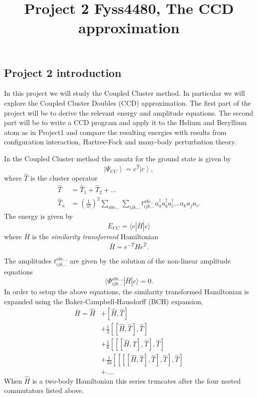 \documentclass[a4paper,10pt]{article}
\title{Project 2 Fyss4480, The CCD approximation}
\author{}
\newcommand{\braket}[1]{\langle#1\rangle}
\newcommand{\ket}[1]{\left| #1 \right\rangle} \newcommand{\element}[3]
\theoremstyle{definition}
\begin{document}
\maketitle

\subsection*{Project 2 introduction}
In this project we will study the Coupled Cluster method. In particular we will explore the Coupled Cluster Doubles (CCD)
approximation. The first part of the project will be to derive the relevant energy and amplitude equations. The second part 
will be to write a CCD program and apply it to the Helium and Beryllium atom as in Project1 and compare the resulting 
energies with results from configuration interaction, Hartree-Fock and many-body perturbation theory.

In the Coupled Cluster method the ansatz for the ground state is given by 
\begin{equation}
 \ket{\Psi_\text{CC}} = e^{\hat{T}}\ket{c},
\end{equation}
where $\hat{T}$ is the cluster operator
\begin{align*}
 \hat{T} &= \hat{T}_1 + \hat{T}_2 + \dots \\
 \hat{T}_n &= \left( \frac{1}{n!} \right)^2 \sum_{abc \dots} \sum_{ijk \dots} t^{abc\dots}_{ijk\dots}a_a^\dagger a_b^\dagger a_c^\dagger \dots a_k a_j a_i. 
\end{align*}
The energy is given by 
\begin{equation}
 E_\text{CC} =  \braket{c|\bar{H}|c}
\end{equation}
where $\bar{H}$ is the \textit{similarity transformed} Hamiltonian
\begin{equation}
 \bar{H} = e^{-\hat{T}}\hat{H}e^{\hat{T}}.
\end{equation}

The amplitudes $t^{abc\dots}_{ijk\dots}$ are given by the solution of the non-linear amplitude equations 
\begin{equation}
 \braket{\Phi^{abc \dots}_{ijk \dots} | \bar{H} | c} = 0.
\end{equation}
In order to setup the above equations, the similarity transformed Hamiltonian is expanded using the Baker-Campbell-Hausdorff (BCH)
expansion, 
\begin{align}
 \bar{H} = \hat{H} &+ [\hat{H},\hat{T}] \nonumber \\
 &+ \frac{1}{2} [[\hat{H},\hat{T}],\hat{T}] \nonumber \\
 &+ \frac{1}{6} [[[\hat{H},\hat{T}],\hat{T}],\hat{T}] \nonumber \\
 &+ \frac{1}{24} [[[[\hat{H},\hat{T}],\hat{T}],\hat{T}],\hat{T}] \nonumber \\
 &+ \dots.
\end{align}
When $\hat{H}$ is a two-body Hamiltonian this series truncates after the four nested commutators listed above.
\end{document}
